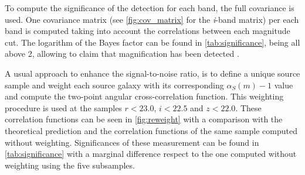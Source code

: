 To compute the significance of the detection for each band, the full covariance is used. One covariance matrix (see \autoref{fig:cov_matrix} for the {\itshape i}-band matrix) per each band is computed taking into account the correlations between each magnitude cut. The logarithm of the Bayes factor can be found in \autoref{tab:significance}, being all above 2, allowing to claim that magnification has been detected \cite{10.2307/2291091}.
\newline
 
 A usual approach to enhance the signal-to-noise ratio, is to define a unique source sample and weight each source galaxy with its corresponding $\alpha_S(m)-1$ value \cite{2003A&A...403..817M} and compute the two-point angular cross-correlation function. This weighting procedure is used at the samples $r < 23.0$, $i < 22.5$ and $z < 22.0$. These correlation functions can be seen in \autoref{fig:reweight} with a comparison with the theoretical prediction and the correlation functions of the same sample computed without weighting. Significances of these measurement can be found in \autoref{tab:significance} with a marginal difference respect to the one computed without weighting using the five subsamples.
